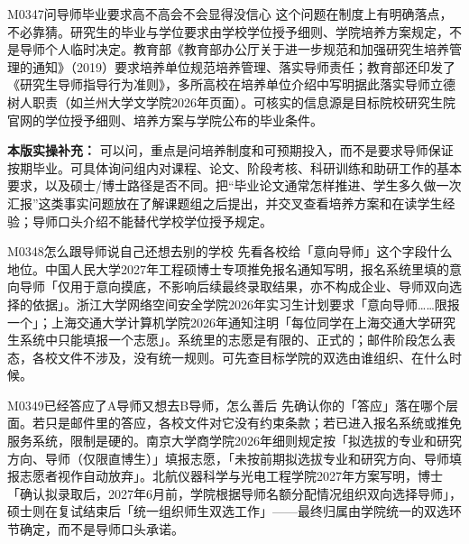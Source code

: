\begin{qa}{M0347}{问导师毕业要求高不高会不会显得没信心}
这个问题在制度上有明确落点，不必靠猜。研究生的毕业与学位要求由学校学位授予细则、学院培养方案规定，不是导师个人临时决定。教育部《教育部办公厅关于进一步规范和加强研究生培养管理的通知》（2019）要求培养单位规范培养管理、落实导师责任；教育部还印发了《研究生导师指导行为准则》，多所高校在培养单位介绍中写明据此落实导师立德树人职责（如兰州大学文学院2026年页面）。可核实的信息源是目标院校研究生院官网的学位授予细则、培养方案与学院公布的毕业条件。
\par\textbf{本版实操补充：} 可以问，重点是问培养制度和可预期投入，而不是要求导师保证按期毕业。可具体询问组内对课程、论文、阶段考核、科研训练和助研工作的基本要求，以及硕士/博士路径是否不同。把“毕业论文通常怎样推进、学生多久做一次汇报”这类事实问题放在了解课题组之后提出，并交叉查看培养方案和在读学生经验；导师口头介绍不能替代学校学位授予规定。
\end{qa}

\begin{qa}{M0348}{怎么跟导师说自己还想去别的学校}
先看各校给「意向导师」这个字段什么地位。中国人民大学2027年工程硕博士专项推免报名通知写明，报名系统里填的意向导师「仅用于意向摸底，不影响后续最终录取结果，亦不构成企业、导师双向选择的依据」。浙江大学网络空间安全学院2026年实习生计划要求「意向导师……限报一个」；上海交通大学计算机学院2026年通知注明「每位同学在上海交通大学研究生系统中只能填报一个志愿」。系统里的志愿是有限的、正式的；邮件阶段怎么表态，各校文件不涉及，没有统一规则。可先查目标学院的双选由谁组织、在什么时候。
\end{qa}

\begin{qa}{M0349}{已经答应了A导师又想去B导师，怎么善后}
先确认你的「答应」落在哪个层面。若只是邮件里的答应，各校文件对它没有约束条款；若已进入报名系统或推免服务系统，限制是硬的。南京大学商学院2026年细则规定按「拟选拔的专业和研究方向、导师（仅限直博生）」填报志愿，「未按前期拟选拔专业和研究方向、导师填报志愿者视作自动放弃」。北航仪器科学与光电工程学院2027年方案写明，博士「确认拟录取后，2027年6月前，学院根据导师名额分配情况组织双向选择导师」，硕士则在复试结束后「统一组织师生双选工作」——最终归属由学院统一的双选环节确定，而不是导师口头承诺。
\end{qa}

